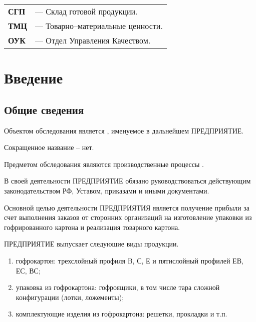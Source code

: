 \begin{tabular}{l l}

{\bf СГП}  & --- Склад готовой продукции.\\
{\bf ТМЦ}  & --- Товарно--материальные ценности.\\
{\bf ОУК}  & ---  Отдел Управления Качеством. \\

\end{tabular}


\newpage

\chapter{Введение}

\section{Общие сведения}

Объектом обследования является \FIRMA, именуемое в дальнейшем ПРЕДПРИЯТИЕ.

Сокращенное название -- нет.

Предметом обследования являются производственные процессы \FIRMA. 


В своей деятельности ПРЕДПРИЯТИЕ обязано руководствоваться действующим законодательством РФ, Уставом, приказами и иными документами.

Основной целью деятельности ПРЕДПРИЯТИЯ является получение прибыли за счет выполнения заказов от сторонних организаций на изготовление упаковки из гофрированного картона и реализация товарного картона. 


ПРЕДПРИЯТИЕ выпускает следующие виды продукции.
\begin{enumerate}
    \item гофрокартон: трехслойный профиля B, С, Е и пятислойный профилей ЕВ, ЕС, ВС;
	\item упаковка из гофрокартона: гофроящики, в том числе тара сложной конфигурации (лотки, ложементы);
	\item комплектующие изделия из гофрокартона: решетки, прокладки и т.п.
\end{enumerate}

